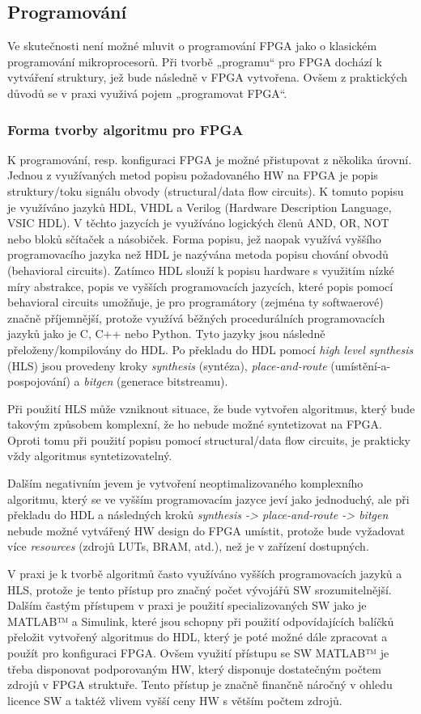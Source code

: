 \documentclass[a4paper, twoside, 11pt]{article}
\begin{document}
		\subsection{Programování}
			Ve skutečnosti není možné mluvit o programování FPGA jako o klasickém programování mikroprocesorů. Při tvorbě „programu“ pro FPGA dochází k vytváření struktury, jež bude následně v FPGA vytvořena. Ovšem z praktických důvodů se v praxi využivá pojem „programovat FPGA“.
		\subsubsection{Forma tvorby algoritmu pro FPGA}\label{subsubsec:forma-tvorby-algoritmu-pro-fpga}
		K programování, resp. konfiguraci FPGA je možné přistupovat z několika úrovní. Jednou z využívaných metod popisu požadovaného HW na FPGA je popis struktury/toku signálu obvody (structural/data flow circuits). K tomuto popisu je využíváno jazyků HDL, VHDL a Verilog (Hardware Description Language, VSIC HDL). V těchto jazycích je využíváno logických členů AND, OR, NOT nebo bloků sčítaček a násobiček. Forma popisu, jež naopak využívá vyššího programovacího jazyka než HDL je nazývána metoda popisu chování obvodů (behavioral circuits). Zatímco HDL slouží k popisu hardware s využitím nízké míry abstrakce, popis ve vyšších programovacích jazycích, které popis pomocí behavioral circuits umožňuje, je pro programátory (zejména ty softwaerové) značně příjemnější, protože využívá běžných procedurálních programovacích jazyků jako je C, C++ nebo Python. Tyto jazyky jsou následně přeloženy/kompilovány do HDL. Po překladu do HDL pomocí \textit{high level synthesis} (HLS) jsou provedeny kroky \textit{synthesis} (syntéza), \textit{place-and-route} (umístění-a-pospojování) a \textit{bitgen} (generace bitstreamu). \cite{Sass2010}\par
		Při použití HLS může vzniknout situace, že bude vytvořen algoritmus, který bude takovým způsobem komplexní, že ho nebude možné syntetizovat na FPGA. Oproti tomu při použití popisu pomocí structural/data flow circuits, je prakticky vždy algoritmus syntetizovatelný. \cite{Sass2010}\par
		Dalším negativním jevem je vytvoření neoptimalizovaného komplexního algoritmu, který se ve vyšším programovacím jazyce jeví jako jednoduchý, ale při překladu do HDL a následných kroků \textit{synthesis -> place-and-route -> bitgen} nebude možné vytvářený HW design do FPGA umístit, protože bude vyžadovat více \textit{resources} (zdrojů LUTs, BRAM, atd.), než je v zařízení dostupných.\par
		V praxi je k tvorbě algoritmů často využíváno vyšších programovacích jazyků a HLS, protože je tento přístup pro značný počet vývojářů SW srozumitelnější. Dalším častým přístupem v praxi je použití specializovaných SW jako je MATLAB™️ a Simulink, které jsou schopny při použití odpovídajících balíčků přeložit vytvořený algoritmus do HDL, který je poté možné dále zpracovat a použít pro konfiguraci FPGA. Ovšem využití přístupu se SW MATLAB™️ je třeba disponovat podporovaným HW, který disponuje dostatečným počtem zdrojů v FPGA struktuře. Tento přístup je značně finančně náročný v ohledu licence SW a taktéž vlivem vyšší ceny HW s větším počtem zdrojů.
\end{document}
